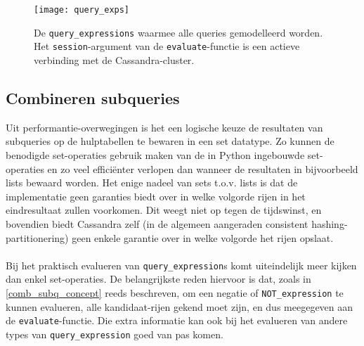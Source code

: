 \begin{figure}[h]
\texttt{[image: query\_exps]}
\caption{De \texttt{query\_expressions} waarmee alle queries gemodelleerd worden. Het \texttt{session}-argument van de \texttt{evaluate}-functie is een actieve verbinding met de Cassandra-cluster.}
\label{query_exps_diagram}
\end{figure}

\subsection{Combineren subqueries}

Uit performantie-overwegingen is het een logische keuze de resultaten van subqueries op de hulptabellen te bewaren in een set datatype. Zo kunnen de benodigde set-operaties gebruik maken van de in Python ingebouwde set-operaties en zo veel effici\"enter verlopen dan wanneer de resultaten in bijvoorbeeld lists bewaard worden. Het enige nadeel van sets t.o.v. lists is dat de implementatie geen garanties biedt over in welke volgorde rijen in het eindresultaat zullen voorkomen. Dit weegt niet op tegen de tijdswinst, en bovendien biedt Cassandra zelf (in de algemeen aangeraden consistent hashing-partitionering) geen enkele garantie over in welke volgorde het rijen opslaat.\\\\
Bij het praktisch evalueren van \texttt{query\_expression}s komt uiteindelijk meer kijken dan enkel set-operaties. De belangrijkste reden hiervoor is dat, zoals in \ref{comb_subq_concept} reeds beschreven, om een negatie of \texttt{NOT\_expression} te kunnen evalueren, alle kandidaat-rijen gekend moet zijn, en dus meegegeven aan de \texttt{evaluate}-functie. Die extra informatie kan ook bij het evalueren van andere types van \texttt{query\_expression} goed van pas komen.
 
